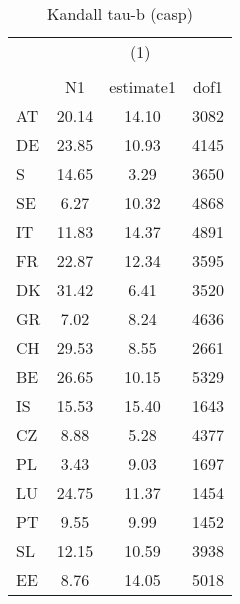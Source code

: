 \begin{table}[htbp]\centering
\def\sym#1{\ifmmode^{#1}\else\(^{#1}\)\fi}
\caption{Kandall tau-b (casp)}
\begin{tabular}{l*{1}{ccc}}
\hline\hline
                    &\multicolumn{3}{c}{(1)}               \\
                    &\multicolumn{3}{c}{}                  \\
                    &          N1&   estimate1&        dof1\\
\hline
AT                  &       20.14&       14.10&        3082\\
DE                  &       23.85&       10.93&        4145\\
S                   &       14.65&        3.29&        3650\\
SE                  &        6.27&       10.32&        4868\\
IT                  &       11.83&       14.37&        4891\\
FR                  &       22.87&       12.34&        3595\\
DK                  &       31.42&        6.41&        3520\\
GR                  &        7.02&        8.24&        4636\\
CH                  &       29.53&        8.55&        2661\\
BE                  &       26.65&       10.15&        5329\\
IS                  &       15.53&       15.40&        1643\\
CZ                  &        8.88&        5.28&        4377\\
PL                  &        3.43&        9.03&        1697\\
LU                  &       24.75&       11.37&        1454\\
PT                  &        9.55&        9.99&        1452\\
SL                  &       12.15&       10.59&        3938\\
EE                  &        8.76&       14.05&        5018\\
\hline\hline
\end{tabular}
\end{table}
